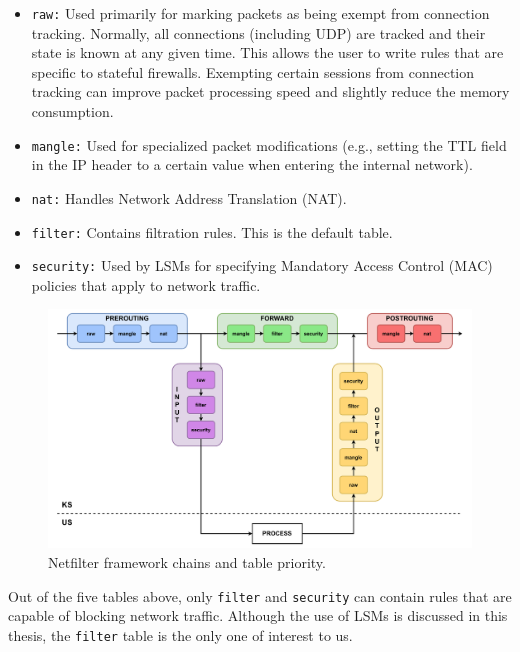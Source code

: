 \begin{itemize}
    \item \texttt{raw:} Used primarily for marking packets as being exempt from
          connection tracking. Normally, all connections (including UDP) are
          tracked and their state is known at any given time. This allows the
          user to write rules that are specific to stateful firewalls. Exempting
          certain sessions from connection tracking can improve packet processing
          speed and slightly reduce the memory consumption.
    \item \texttt{mangle:} Used for specialized packet modifications (e.g.,
          setting the TTL field in the IP header to a certain value when entering
          the internal network).
    \item \texttt{nat:} Handles Network Address Translation (NAT).
    \item \texttt{filter:} Contains filtration rules. This is the default table.
    \item \texttt{security:} Used by LSMs for specifying Mandatory Access Control
          (MAC) policies that apply to network traffic.
\end{itemize}

\begin{figure}[h]
    \centering
    \includegraphics[width=\textwidth,keepaspectratio]{figures/netfilter_struct.pdf}
    \caption{Netfilter framework chains and table priority.}
    \label{background:firewall:fig:netfilter}
\end{figure}

Out of the five tables above, only \texttt{filter} and \texttt{security} can
contain rules that are capable of blocking network traffic. Although the use of
LSMs is discussed in this thesis, the \texttt{filter} table is the only one
of interest to us.

